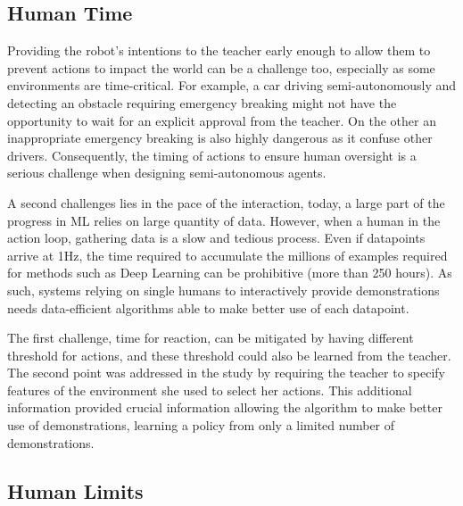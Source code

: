 \documentclass[letterpaper, 10 pt, conference]{ieeeconf}  %
\begin{document}
\subsection{Human Time}

Providing the robot's intentions to the teacher early enough to allow them to prevent actions to impact the world can be a challenge too, especially as some environments are time-critical. For example, a car driving semi-autonomously and detecting an obstacle requiring emergency breaking might not have the opportunity to wait for an explicit approval from the teacher. On the other an inappropriate emergency breaking is also highly dangerous as it confuse other drivers. Consequently, the timing of actions to ensure human oversight is a serious challenge when designing semi-autonomous agents.

A second challenges lies in the pace of the interaction, today, a large part of the progress in ML relies on large quantity of data. However, when a human in the action loop, gathering data is a slow and tedious process. Even if datapoints arrive at 1Hz, the time required to accumulate the millions of examples required for methods such as Deep Learning \cite{lecun2015deep} can be prohibitive (more than 250 hours). As such, systems relying on single humans to interactively provide demonstrations needs data-efficient algorithms able to make better use of each datapoint.

The first challenge, time for reaction, can be mitigated by having different threshold for actions, and these threshold could also be learned from the teacher. The second point was addressed in the study by requiring the teacher to specify features of the environment she used to select her actions. This additional information provided crucial information allowing the algorithm to make better use of demonstrations, learning a policy from only a limited number of demonstrations.

\subsection{Human Limits}
\end{document}
